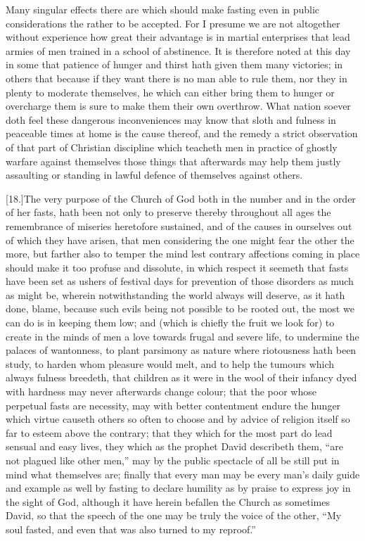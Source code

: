 Many singular effects there are which should make fasting even in public considerations the rather to be accepted. For I presume we are not altogether without experience how great their advantage is in martial enterprises that lead armies of men trained in a school of abstinence. It is therefore noted at this day in some that patience of hunger and thirst hath given them many victories; in others that because if they want there is no man able to rule them, nor they in plenty to moderate themselves, he which can either bring them to hunger or overcharge them is sure to make them their own overthrow.  What nation soever doth feel these dangerous inconveniences may know that sloth and fulness in peaceable times at home is the cause thereof,
 and the remedy a strict observation of that part of Christian discipline which teacheth men in practice of ghostly warfare against themselves those things that afterwards may help them justly assaulting or standing in lawful defence of themselves against others.

[18.]The very purpose of the Church of God both in the number and in the order of her fasts, hath been not only to preserve thereby throughout all ages the remembrance of miseries heretofore sustained, and of the causes in ourselves out of which they have arisen, that men considering the one might fear the other the more, but farther also to temper the mind lest contrary affections coming in place should make it too profuse and dissolute, in which respect it seemeth that fasts have been set as ushers of festival days for prevention of those disorders as much as might be, wherein notwithstanding the world always will deserve, as it hath done, blame, because such evils being not possible to be rooted out, the most we can do is in keeping them low; and (which is chiefly the fruit we look for) to create in the minds of men a love towards frugal and severe life, to undermine the palaces of wantonness, to plant parsimony as nature where riotousness hath been study, to harden whom pleasure would melt, and to help the tumours which always fulness breedeth, that children as it were in the wool of their infancy dyed with hardness may never afterwards change colour; that the poor whose perpetual fasts are necessity, may with better contentment endure the hunger which virtue causeth others so often to choose and by advice of religion itself so far to esteem above the contrary; that they which for the most part do lead sensual and easy lives, they which as the prophet David describeth them, “are not plagued like other men,” may by the public spectacle of all be still put in mind what themselves are; finally that  every man may be every man’s daily guide and example as well by fasting to declare humility as by praise to express joy in the sight of God,
 although it have herein befallen the Church as sometimes David, so that the speech of the one may be truly the voice of the other, “My soul fasted, and even that was also turned to my reproof.”


